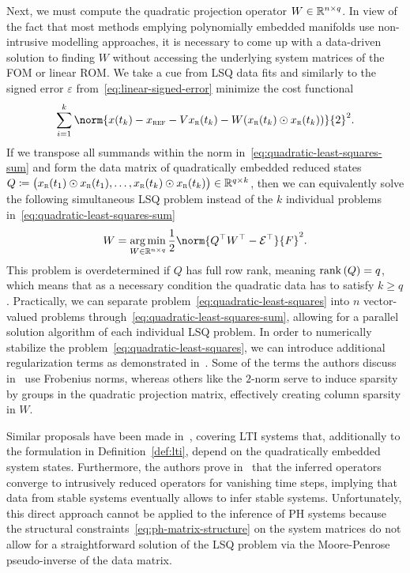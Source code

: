 Next, we must compute the quadratic projection operator $W \in \mathbb{R}^{n \times q}$.
In view of the fact that most methods emplying polynomially embedded manifolds use non-intrusive modelling approaches, it is necessary to come up with a data-driven solution to finding $W$ without accessing the underlying system matrices of the \ac{FOM} or linear \ac{ROM}.
We take a cue from \ac{LSQ} data fits and similarly to the signed error $\varepsilon$ from~\eqref{eq:linear-signed-error} minimize the cost functional
\begin{equation}\label{eq:quadratic-least-squares-sum}
    \sum\limits_{i = 1}^k \norm{x(t_k) - x_\msc{ref} - V x_\msc{r}(t_k) - W (x_\msc{r}(t_k) \odot x_\msc{r}(t_k))}{2}^2.
\end{equation}
If we transpose all summands within the norm in~\eqref{eq:quadratic-least-squares-sum} and form the data matrix of quadratically embedded reduced states $Q \coloneqq {\big( x_{\textnormal{\scshape r}}(t_1) \odot x_{\textnormal{\scshape r}}(t_1), \dots, x_{\textnormal{\scshape r}}(t_k) \odot x_{\textnormal{\scshape r}}(t_k) \big)} \in \mathbb{R}^{q \times k}$, then we can equivalently solve the following simultaneous \ac{LSQ} problem instead of the $k$ individual problems in~\eqref{eq:quadratic-least-squares-sum}
\begin{equation}\label{eq:quadratic-least-squares}
    W = \argmin\limits_{W \in \bb{R}^{n \times q}} \frac{1}{2} \norm{Q\trans W\trans - \mcl{E}\trans}{F}^2.
\end{equation}
This problem is overdetermined if $Q$ has full row rank, meaning $\mathop{}\!\mathrm{rank}\left(Q\right) = q$, which means that as a necessary condition the quadratic data has to satisfy $k \geq q$.
Practically, we can separate problem~\eqref{eq:quadratic-least-squares} into $n$ vector-valued problems through~\eqref{eq:quadratic-least-squares-sum}, allowing for a parallel solution algorithm of each individual \ac{LSQ} problem.
In order to numerically stabilize the problem~\eqref{eq:quadratic-least-squares}, we can introduce additional regularization terms as demonstrated in~\cite[Equation~15]{Geelen2023}.
Some of the terms the authors discuss in~\cite{Geelen2023} use Frobenius norms, whereas others like the $2$-norm serve to induce sparsity by groups in the quadratic projection matrix, effectively creating column sparsity in $W$.

Similar proposals have been made in~\cite{Peherstorfer2016}, covering \ac{LTI} systems that, additionally to the formulation in Definition~\ref{def:lti}, depend on the quadratically embedded system states.
Furthermore, the authors prove in~\cite[Theorem~1, Corollary~1]{Peherstorfer2016} that the inferred operators converge to intrusively reduced operators for vanishing time steps, implying that data from stable systems eventually allows to infer stable systems.
Unfortunately, this direct approach cannot be applied to the inference of \ac{PH} systems because the structural constraints~\eqref{eq:ph-matrix-structure} on the system matrices do not allow for a straightforward solution of the \ac{LSQ} problem via the Moore-Penrose pseudo-inverse of the data matrix.
